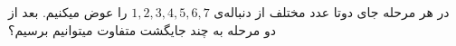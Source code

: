 در هر مرحله جای دوتا عدد مختلف از دنباله‌ی $1, 2, 3, 4, 5, 6, 7$ را عوض میکنیم.
بعد از دو مرحله به چند جایگشت متفاوت میتوانیم برسیم؟
